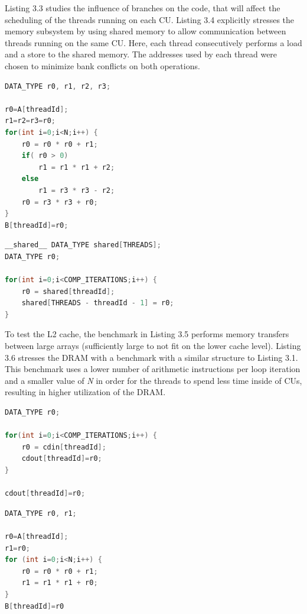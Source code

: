 Listing 3.3 studies the influence of branches on the code, that will affect the scheduling of the threads running on each CU. Listing 3.4 explicitly stresses the memory subsystem by using shared memory to allow communication between threads running on the same CU. Here, each thread consecutively performs a load and a store to the shared memory. The addresses used by each thread were chosen to minimize bank conflicts on both operations.


\noindent\begin{minipage}{.38\textwidth}
\begin{lstlisting}[language=C, caption={Branches Code}]
DATA_TYPE r0, r1, r2, r3;

r0=A[threadId]; 
r1=r2=r3=r0; 
for(int i=0;i<N;i++) {  
    r0 = r0 * r0 + r1;  
    if( r0 > 0)
        r1 = r1 * r1 + r2; 
    else 
        r1 = r3 * r3 - r2; 
    r0 = r3 * r3 + r0; 
} 
B[threadId]=r0;
\end{lstlisting}
\end{minipage}\hfill
\begin{minipage}{.59\textwidth}
\begin{lstlisting}[language=C, caption={Shared Memory Code}]
__shared__ DATA_TYPE shared[THREADS]; 
DATA_TYPE r0; 

for(int i=0;i<COMP_ITERATIONS;i++) {  
    r0 = shared[threadId];      
    shared[THREADS - threadId - 1] = r0;
}
\end{lstlisting}
\end{minipage}

To test the L2 cache, the benchmark in Listing 3.5 performs memory transfers between large arrays (sufficiently large to not fit on the lower cache level). Listing 3.6 stresses the DRAM with a benchmark with a similar structure to Listing 3.1. This benchmark uses a lower number of arithmetic instructions per loop iteration and a smaller value of \textit{N} in order for the threads to spend less time inside of CUs, resulting in higher utilization of the DRAM.

\noindent\begin{minipage}{.55\textwidth}
\begin{lstlisting}[language=C, caption={L2 Cache Code}]
DATA_TYPE r0;

for(int i=0;i<COMP_ITERATIONS;i++) {      
    r0 = cdin[threadId];      
    cdout[threadId]=r0;
} 

cdout[threadId]=r0;
\end{lstlisting}
\end{minipage}\hfill
\begin{minipage}{.4\textwidth}
\begin{lstlisting}[language=C, caption={DRAM Code}]
DATA_TYPE r0, r1;

r0=A[threadId]; 
r1=r0; 
for (int i=0;i<N;i++) {  
    r0 = r0 * r0 + r1;  
    r1 = r1 * r1 + r0; 
} 
B[threadId]=r0
\end{lstlisting}
\end{minipage}


